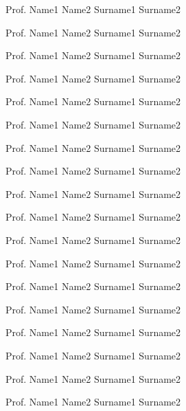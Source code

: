 

\frontmatter %

\pagestyle{thesis}


\maketitlepage


\begin{council}
{\setlength{\baselineskip}{0.5em}\setlength{\parindent}{1.5em}

{\raggedright{\textbf{\titcouncillabel}}\par}
\smallskip

Prof. Name1 Name2 Surname1 Surname2 \par
Prof. Name1 Name2 Surname1 Surname2 \par
Prof. Name1 Name2 Surname1 Surname2 \par
Prof. Name1 Name2 Surname1 Surname2 \par
Prof. Name1 Name2 Surname1 Surname2 \par
Prof. Name1 Name2 Surname1 Surname2 \par
Prof. Name1 Name2 Surname1 Surname2 \par
Prof. Name1 Name2 Surname1 Surname2 \par
Prof. Name1 Name2 Surname1 Surname2 \par

\null\vskip 10pt
	
{\raggedright{\textbf{\subscouncillabel}}\par}
\smallskip

Prof. Name1 Name2 Surname1 Surname2 \par
Prof. Name1 Name2 Surname1 Surname2 \par
Prof. Name1 Name2 Surname1 Surname2 \par
Prof. Name1 Name2 Surname1 Surname2 \par
Prof. Name1 Name2 Surname1 Surname2 \par
Prof. Name1 Name2 Surname1 Surname2 \par
Prof. Name1 Name2 Surname1 Surname2 \par
Prof. Name1 Name2 Surname1 Surname2 \par
Prof. Name1 Name2 Surname1 Surname2 \par

}
\end{council}



